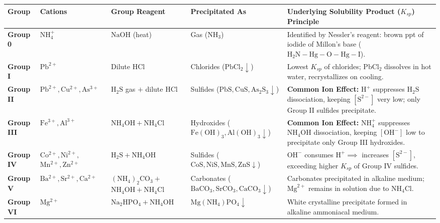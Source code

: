 \documentclass[10pt,a4paper]{article}
\begin{document}
\begin{conceptbox}
\begin{center}
\scriptsize
\begin{tabular}{|p{1.2cm}|p{2.2cm}|p{3.2cm}|p{2.6cm}|p{5.1cm}|}
\hline
\textbf{Group} & \textbf{Cations} & \textbf{Group Reagent} & \textbf{Precipitated As} & \textbf{Underlying Solubility Product ($K_{sp}$) Principle} \\
\hline
\textbf{Group 0} & $\mathrm{NH_4^+}$ & $\mathrm{NaOH}$ (heat) & Gas ($\mathrm{NH_3}$) & Identified by Nessler's reagent: brown ppt of iodide of Millon's base ($\mathrm{H_2N-Hg-O-Hg-I}$). \\
\hline
\textbf{Group I} & $\mathrm{Pb^{2+}}$ & Dilute $\mathrm{HCl}$ & Chlorides ($\mathrm{PbCl_2} \downarrow$) & Lowest $K_{sp}$ of chlorides; $\mathrm{PbCl_2}$ dissolves in hot water, recrystallizes on cooling. \\
\hline
\textbf{Group II} & $\mathrm{Pb^{2+}, Cu^{2+}, As^{3+}}$ & $\mathrm{H_2S}$ gas $+$ dilute $\mathrm{HCl}$ & Sulfides ($\mathrm{PbS, CuS, As_2S_3} \downarrow$) & \textbf{Common Ion Effect:} $\mathrm{H}^+$ suppresses $\mathrm{H_2S}$ dissociation, keeping $[\mathrm{S}^{2-}]$ very low; only Group II sulfides precipitate. \\
\hline
\textbf{Group III} & $\mathrm{Fe^{3+}, Al^{3+}}$ & $\mathrm{NH_4OH} + \mathbf{\mathrm{NH_4Cl}}$ & Hydroxides ($\mathrm{Fe(OH)_3, Al(OH)_3} \downarrow$) & \textbf{Common Ion Effect:} $\mathrm{NH_4^+}$ suppresses $\mathrm{NH_4OH}$ dissociation, keeping $[\mathrm{OH}^-]$ low to precipitate only Group III hydroxides. \\
\hline
\textbf{Group IV} & $\mathrm{Co^{2+}, Ni^{2+}},$ \newline $\mathrm{Mn^{2+}, Zn^{2+}}$ & $\mathrm{H_2S} + \mathbf{\mathrm{NH_4OH}}$ & Sulfides \newline ($\mathrm{CoS, NiS, MnS, ZnS} \downarrow$) & $\mathrm{OH}^-$ consumes $\mathrm{H}^+ \implies$ increases $[\mathrm{S}^{2-}]$, exceeding higher $K_{sp}$ of Group IV sulfides. \\
\hline
\textbf{Group V} & $\mathrm{Ba^{2+}, Sr^{2+}, Ca^{2+}}$ & $(\mathrm{NH_4})_2\mathrm{CO_3} +$ \newline $\mathrm{NH_4OH} + \mathrm{NH_4Cl}$ & Carbonates \newline ($\mathrm{BaCO_3, SrCO_3, CaCO_3} \downarrow$) & Carbonates precipitated in alkaline medium; $\mathrm{Mg}^{2+}$ remains in solution due to $\mathrm{NH_4Cl}$. \\
\hline
\textbf{Group VI} & $\mathrm{Mg^{2+}}$ & $\mathrm{Na_2HPO_4} + \mathrm{NH_4OH}$ & $\mathrm{Mg(NH_4)PO_4} \downarrow$ & White crystalline precipitate formed in alkaline ammoniacal medium. \\
\hline
\end{tabular}
\end{center}
\end{conceptbox}
\end{document}
